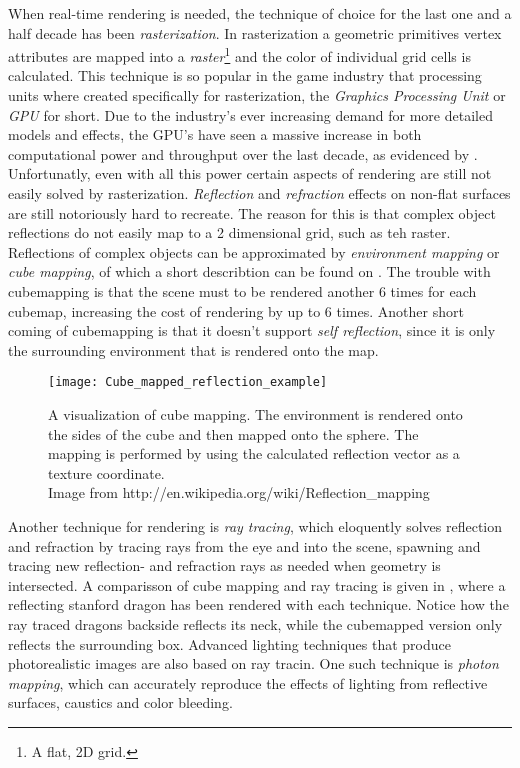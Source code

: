 When real-time rendering is needed, the technique of choice for the
last one and a half decade has been \textit{rasterization}. In
rasterization a geometric primitives vertex attributes are mapped into
a \textit{raster}\footnote{A flat, 2D grid.} and the color of
individual grid cells is calculated. This technique is so popular in
the game industry that processing units where created specifically for
rasterization, the \textit{Graphics Processing Unit} or \textit{GPU}
for short. Due to the industry's ever increasing demand for more
detailed models and effects, the GPU's have seen a massive increase in
both computational power and throughput over the last decade, as
evidenced by . Unfortunatly, even with all this
power certain aspects of rendering are still not easily solved by
rasterization. \textit{Reflection} and \textit{refraction} effects on
non-flat surfaces are still notoriously hard to recreate. The reason
for this is that complex object reflections do not easily map to a 2
dimensional grid, such as teh raster. Reflections of complex objects
can be approximated by \textit{environment mapping} or \textit{cube
  mapping}, of which a short describtion can be found on
. The trouble with cubemapping is that the scene
must to be rendered another 6 times for each cubemap, increasing the
cost of rendering by up to 6 times. Another short coming of
cubemapping is that it doesn't support \textit{self reflection}, since
it is only the surrounding environment that is rendered onto the map.

\begin{figure}
  \centering
  \texttt{[image: Cube\_mapped\_reflection\_example]}
  \vspace{3mm}
  \parbox{9.5cm}{\caption[Cube mapping visualized.]{A visualization of
      cube mapping. The environment is rendered onto the sides of the
      cube and then mapped onto the sphere. The mapping is performed
      by using the calculated reflection vector as a texture
      coordinate.\\Image from
      http://en.wikipedia.org/wiki/Reflection\_mapping}\label{fig:cubemap}}
\end{figure}


Another technique for rendering is \textit{ray tracing}, which
eloquently solves reflection and refraction by tracing rays from the
eye and into the scene, spawning and tracing new reflection- and
refraction rays as needed when geometry is intersected. A comparisson
of cube mapping and ray tracing is given in
, where a reflecting stanford dragon has
been rendered with each technique. Notice how the ray traced dragons
backside reflects its neck, while the cubemapped version only reflects
the surrounding box. Advanced lighting techniques that produce
photorealistic images are also based on ray tracin. One such technique
is \textit{photon mapping}, which can accurately reproduce the effects
of lighting from reflective surfaces, caustics and color bleeding.


